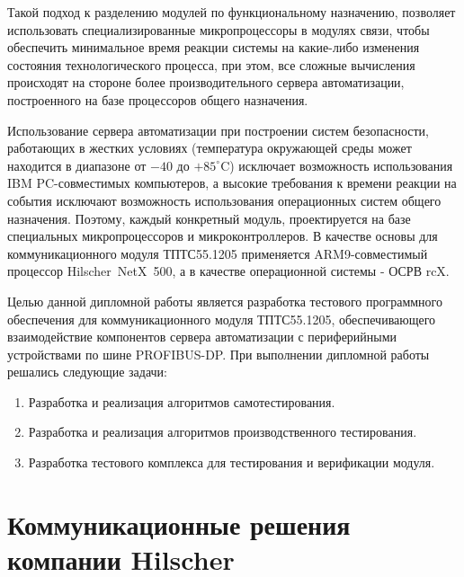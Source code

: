 \documentclass[a4paper,14pt,bachelor]{disser}
\begin{document}
Такой подход к разделению модулей по функциональному назначению, позволяет использовать специализированные микропроцессоры в модулях связи, чтобы обеспечить минимальное время реакции системы на какие-либо изменения состояния технологического процесса, при этом, все сложные вычисления происходят на стороне более производительного сервера автоматизации, построенного на базе процессоров общего назначения.

Использование сервера автоматизации при построении систем безопасности, работающих в жестких условиях (температура окружающей среды может находится в диапазоне от $-40$ до $+85^\circ$C) исключает возможность использования IBM PC-совместимых компьютеров, а высокие требования к времени реакции на события исключают возможность использования операционных систем общего назначения. Поэтому, каждый конкретный модуль, проектируется на базе специальных микропроцессоров и микроконтроллеров. В качестве основы для коммуникационного модуля ТПТС55.1205 применяется ARM9-совместимый процессор Hilscher~NetX~500, а в качестве операционной системы - ОСРВ rcX.

Целью данной дипломной работы является разработка тестового программного обеспечения для коммуникационного модуля ТПТС55.1205, обеспечивающего взаимодействие компонентов сервера автоматизации с периферийными устройствами по шине PROFIBUS-DP. При выполнении дипломной работы решались следующие задачи:
\begin{enumerate}
 \item Разработка и реализация алгоритмов самотестирования.
 \item Разработка и реализация алгоритмов производственного тестирования.
 \item Разработка тестового комплекса для тестирования и верификации модуля.
\end{enumerate}

\chapter{Коммуникационные решения компании Hilscher}
\end{document}
